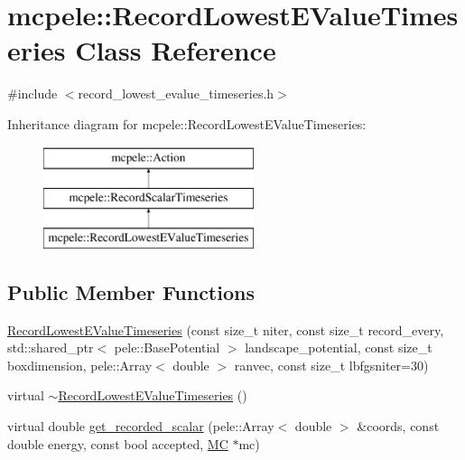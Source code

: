 \hypertarget{classmcpele_1_1RecordLowestEValueTimeseries}{\section{mcpele\-:\-:\-Record\-Lowest\-E\-Value\-Timeseries \-Class \-Reference}
\label{classmcpele_1_1RecordLowestEValueTimeseries}
}


{\ttfamily \#include $<$record\-\_\-lowest\-\_\-evalue\-\_\-timeseries.\-h$>$}

\-Inheritance diagram for mcpele\-:\-:\-Record\-Lowest\-E\-Value\-Timeseries\-:\begin{figure}[H]
\begin{center}
\leavevmode
\includegraphics[height=3.000000cm]{classmcpele_1_1RecordLowestEValueTimeseries}
\end{center}
\end{figure}
\subsection*{\-Public \-Member \-Functions}
\begin{DoxyCompactItemize}
\item 
\hyperlink{classmcpele_1_1RecordLowestEValueTimeseries_a9ab99a86595a3620babe35e5e1e26083}{\-Record\-Lowest\-E\-Value\-Timeseries} (const size\-\_\-t niter, const size\-\_\-t record\-\_\-every, std\-::shared\-\_\-ptr$<$ pele\-::\-Base\-Potential $>$ landscape\-\_\-potential, const size\-\_\-t boxdimension, pele\-::\-Array$<$ double $>$ ranvec, const size\-\_\-t lbfgsniter=30)
\item 
virtual \hyperlink{classmcpele_1_1RecordLowestEValueTimeseries_a90ba22381fd38a8fff5adced32a2a64f}{$\sim$\-Record\-Lowest\-E\-Value\-Timeseries} ()
\item 
virtual double \hyperlink{classmcpele_1_1RecordLowestEValueTimeseries_affb535be88d9352a5b323e26a7c17bd2}{get\-\_\-recorded\-\_\-scalar} (pele\-::\-Array$<$ double $>$ \&coords, const double energy, const bool accepted, \hyperlink{classmcpele_1_1MC}{\-M\-C} $\ast$mc)
\end{DoxyCompactItemize}


